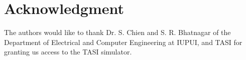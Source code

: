 \documentclass[conference]{IEEEtran}
\begin{document}



\section*{Acknowledgment}
The authors would like to thank Dr. S. Chien and S. R. Bhatnagar of the Department of Electrical and Computer Engineering at IUPUI, and TASI for granting us access to the TASI simulator.









%



%
%


\end{document}

